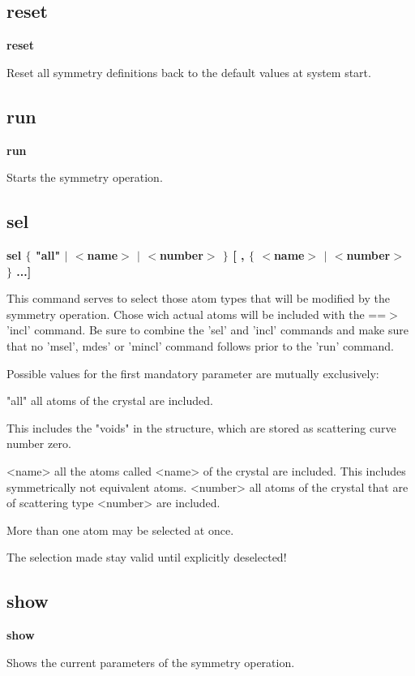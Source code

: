 \subsection*{reset}
{\bf reset \par }
\par
\vspace{3pt}
Reset all symmetry definitions back to the default values at 
system start. 
\subsection*{run}
{\bf run \par }
\par
\vspace{3pt}
Starts the symmetry operation. 
\subsection*{sel}
{\bf sel $ \{$ "all" $| $ $ <$name$> $ $| $ $ <$number$> $ $\} $ [ , $ \{$ $ <$name$> $ $| $ $ <$number$> $ $\} $ ...] \par }
\par
\vspace{3pt}
This command serves to select those atom types 
that will be modified by the symmetry operation. 
Chose wich actual atoms will be included with the 
==$> $ 'incl' command. 
Be sure to combine the 'sel' and 'incl' commands and 
make sure that no 'msel', mdes' or 'mincl' command follows 
prior to the 'run' command. 
\par
Possible values for the first mandatory parameter are 
mutually exclusively: 
\par
\begin{MacVerbatim}
"all"     all atoms of the crystal are included.
\end{MacVerbatim}
          This includes the "voids" in the structure, which are stored 
          as scattering curve number zero. 
\begin{MacVerbatim}
<name>    all the atoms called <name> of the crystal are included.
          This includes symmetrically not equivalent atoms.
<number>  all atoms of the crystal that are of scattering type <number>
          are included.
\end{MacVerbatim}
More than one atom may be selected at once. 
\par
The selection made stay valid until explicitly deselected! 
\subsection*{show}
{\bf show \par }
\par
\vspace{3pt}
Shows the current parameters of the symmetry operation. 
